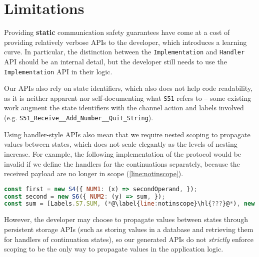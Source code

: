 \section{Limitations}
\label{section:nodelimitations}

Providing \textbf{static} communication safety guarantees have
come at a cost of providing relatively verbose APIs to the developer,
which introduces a learning curve. In particular,
the distinction between the \texttt{Implementation} and
\texttt{Handler} API should be an internal detail, but
the developer still needs to use the \texttt{Implementation} API
in their logic. 

Our APIs also rely on state identifiers, which also
does not help code readability, as it is neither apparent nor
self-documenting what \texttt{S51} refers to -- some existing work
\cite{Hybrid2016} augment the state identifiers with the channel
action and labels involved (e.g. 
\texttt{S51_Receive__Add_Number__Quit_String}).

Using handler-style APIs also mean that we require
nested scoping to propagate values between states,
which does not scale elegantly as the levels of nesting
increase. For example, the following implementation of
the  protocol would be invalid if
we define the handlers for the continuations separately,
because the received payload are no longer in scope
(\cref{line:notinscope}).

\begin{lstlisting}[language=javascript]
const first = new S4({ NUM1: (x) => secondOperand, });
const second = new S6({ NUM2: (y) => sum, });
const sum = [Labels.S7.SUM, (*@\label{line:notinscope}\hl{???}@*), new S5()];
\end{lstlisting}

However, the developer may choose to propagate values
between states through persistent storage APIs (such as
storing values in a database and retrieving them for
handlers of continuation states), so our generated APIs
do not \textit{strictly} enforce scoping to be the only way to
propagate values in the application logic.